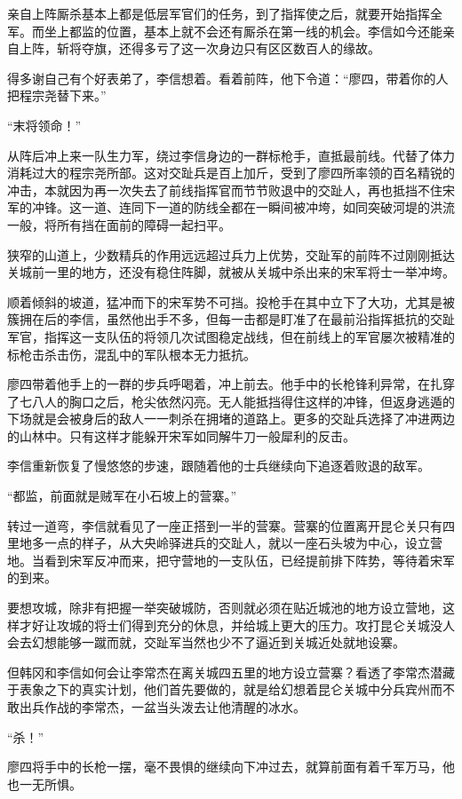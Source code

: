 亲自上阵厮杀基本上都是低层军官们的任务，到了指挥使之后，就要开始指挥全军。而坐上都监的位置，基本上就不会还有厮杀在第一线的机会。李信如今还能亲自上阵，斩将夺旗，还得多亏了这一次身边只有区区数百人的缘故。

得多谢自己有个好表弟了，李信想着。看着前阵，他下令道：“廖四，带着你的人把程宗尧替下来。”

“末将领命！”

从阵后冲上来一队生力军，绕过李信身边的一群标枪手，直抵最前线。代替了体力消耗过大的程宗尧所部。这对交趾兵是百上加斤，受到了廖四所率领的百名精锐的冲击，本就因为再一次失去了前线指挥官而节节败退中的交趾人，再也抵挡不住宋军的冲锋。这一道、连同下一道的防线全都在一瞬间被冲垮，如同突破河堤的洪流一般，将所有挡在面前的障碍一起扫平。

狭窄的山道上，少数精兵的作用远远超过兵力上优势，交趾军的前阵不过刚刚抵达关城前一里的地方，还没有稳住阵脚，就被从关城中杀出来的宋军将士一举冲垮。

顺着倾斜的坡道，猛冲而下的宋军势不可挡。投枪手在其中立下了大功，尤其是被簇拥在后的李信，虽然他出手不多，但每一击都是盯准了在最前沿指挥抵抗的交趾军官，指挥这一支队伍的将领几次试图稳定战线，但在前线上的军官屡次被精准的标枪击杀击伤，混乱中的军队根本无力抵抗。

廖四带着他手上的一群的步兵呼喝着，冲上前去。他手中的长枪锋利异常，在扎穿了七八人的胸口之后，枪尖依然闪亮。无人能抵挡得住这样的冲锋，但返身逃遁的下场就是会被身后的敌人一一刺杀在拥堵的道路上。更多的交趾兵选择了冲进两边的山林中。只有这样才能躲开宋军如同解牛刀一般犀利的反击。

李信重新恢复了慢悠悠的步速，跟随着他的士兵继续向下追逐着败退的敌军。

“都监，前面就是贼军在小石坡上的营寨。”

转过一道弯，李信就看见了一座正搭到一半的营寨。营寨的位置离开昆仑关只有四里地多一点的样子，从大央岭驿进兵的交趾人，就以一座石头坡为中心，设立营地。当看到宋军反冲而来，把守营地的一支队伍，已经提前排下阵势，等待着宋军的到来。

要想攻城，除非有把握一举突破城防，否则就必须在贴近城池的地方设立营地，这样才好让攻城的将士们得到充分的休息，并给城上更大的压力。攻打昆仑关城没人会去幻想能够一蹴而就，交趾军当然也少不了逼近到关城近处就地设寨。

但韩冈和李信如何会让李常杰在离关城四五里的地方设立营寨？看透了李常杰潜藏于表象之下的真实计划，他们首先要做的，就是给幻想着昆仑关城中分兵宾州而不敢出兵作战的李常杰，一盆当头泼去让他清醒的冰水。

“杀！”

廖四将手中的长枪一摆，毫不畏惧的继续向下冲过去，就算前面有着千军万马，他也一无所惧。

